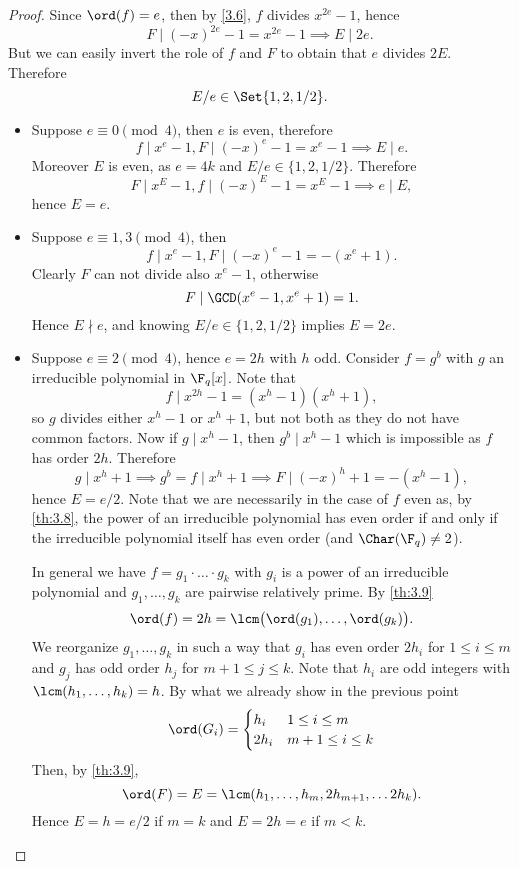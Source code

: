 \begin{proof}
	Since \(\ord(f)=e\), then by \autoref{3.6}, \(f\) divides \(x^{2e}-1\), hence
	\[
		F \mid (-x)^{2e}-1 = x^{2e}-1 \implies E \mid 2e.
	\]
	But we can easily invert the role of \(f\) and \(F\) to obtain that \(e\) divides \(2E\). Therefore
	\[
		E/e \in \Set{1,2,1/2}.
	\]
	\begin{itemize}
		\item Suppose \(e \equiv 0 \pmod{4}\), then \(e\) is even, therefore
		      \[
			      f \mid x^e-1, F\mid (-x)^e-1 = x^e-1 \implies E \mid e.
		      \]
		      Moreover \(E\) is even, as \(e=4k\) and \(E/e \in \{1,2,1/2\}\). Therefore
		      \[
			      F \mid x^E-1, f \mid (-x)^E-1 = x^E-1 \implies e \mid E,
		      \]
		      hence \(E=e\).
		\item Suppose \(e \equiv 1,3 \pmod{4}\), then
		      \[
			      f \mid x^e-1, F \mid (-x)^e-1 = -(x^e+1).
		      \]
		      Clearly \(F\) can not divide also \(x^e-1\), otherwise
		      \[
			      F \mid \GCD(x^e-1,x^e+1) =1.
		      \]
		      Hence \(E \nmid e\), and knowing \(E/e \in \{1,2,1/2\}\) implies \(E=2e\).
		\item Suppose \(e \equiv 2 \pmod{4}\), hence \(e = 2h\) with \(h\) odd. Consider \(f=g^b\) with \(g\) an irreducible polynomial in \(\F_q[x]\). Note that
		      \[
			      f \mid x^{2h}-1 = (x^h-1)(x^h+1),
		      \]
		      so \(g\) divides either \(x^h-1\) or \(x^h+1\), but not both as they do not have common factors.
		      Now if \(g\mid x^h-1\), then \(g^b \mid x^h-1\) which is impossible as \(f\) has order \(2h\). Therefore
		      \[
			      g \mid x^h+1 \implies g^b=f \mid x^h+1 \implies F \mid (-x)^h +1 = -(x^h-1),
		      \]
		      hence \(E=e/2\). Note that we are necessarily in the case of \(f\) even as, by \autoref{th:3.8}, the power of an irreducible polynomial has even order if and only if the irreducible polynomial itself has even order (and \(\Char(\F_q)\neq 2\)).
		      
		      In general we have \(f = g_1 \cdot\ldots\cdot g_k\) with \(g_i\) is a power of an irreducible polynomial and \(g_1,\ldots,g_k\) are pairwise relatively prime. By \autoref{th:3.9}
		      \[
			      \ord(f) = 2h = \lcm\big(\ord(g_1),\ldots,\ord(g_k)\big).
		      \]
		      We reorganize \(g_1,\ldots,g_k\) in such a way that \(g_i\) has even order \(2 h_i\) for \(1\le i \le m\) and \(g_j\) has odd order \(h_j\) for \(m+1 \le j \le k\). Note that \(h_i\) are odd integers with \(\lcm(h_1,\ldots,h_k)=h\). By what we already show in the previous point
		      \[
			      \ord(G_i) =
			      \begin{cases}
				      h_i  & 1 \le i \le m    \\
				      2h_i & m+1 \le i \le k
			      \end{cases}
		      \]
		      Then, by \autoref{th:3.9},
		      \[
			      \ord(F) = E = \lcm(h_1,\ldots,h_m,2h_{m+1}, \ldots 2h_k).
		      \]
		      Hence \(E=h=e/2\) if \(m=k\) and \(E=2h=e\) if \(m<k\).\qedhere
	\end{itemize}
\end{proof}

